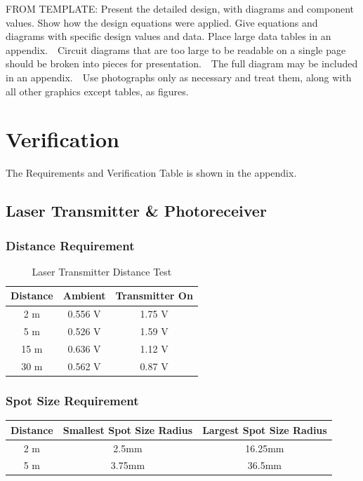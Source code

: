 \documentclass[letterpaper,10pt]{article}
\begin{document}
\begin{spacing}{1.15}
FROM TEMPLATE: Present the detailed design, with diagrams and component values. Show how the design equations were applied. Give equations and diagrams with specific design values and data. Place large data tables in an appendix.  Circuit diagrams that are too large to be readable on a single page should be broken into pieces for presentation.  The full diagram may be included in an appendix.  Use photographs only as necessary and treat them, along with all other graphics except tables, as figures.


\section{Verification}

The Requirements and Verification Table is shown in the appendix.


\subsection{Laser Transmitter \& Photoreceiver}
\subsubsection{Distance Requirement}
\begin{table}[htbp]
	\centering
	\begin{tabular}{c|c|c}	%
		\toprule	%
		Distance & Ambient & Transmitter On \\
		\midrule
		2 m  & 0.556 V & 1.75 V\\
		5 m & 0.526 V & 1.59 V\\
		15 m & 0.636 V & 1.12 V\\ 
		30 m & 0.562 V & 0.87 V\\
		
		\bottomrule	%
	\end{tabular}%
	\caption{Laser Transmitter Distance Test}
	\label{tab:distance-requirement}	%
\end{table}%

\subsubsection{Spot Size Requirement}
\begin{table}[htbp]
	\centering
	\begin{tabular}{c|c|c}	%
		\toprule	%
		Distance & Smallest Spot Size Radius & Largest Spot Size Radius \\
		\midrule
		2 m  & 2.5mm & 16.25mm\\
		5 m & 3.75mm & 36.5mm\\


\end{tabular}
\end{table}
\end{spacing}
\end{document}
